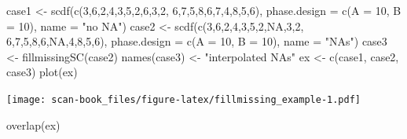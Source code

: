 \documentclass[
]{book}
\newenvironment{Shaded}{\begin{snugshade}}{\end{snugshade}}
\newcommand{\AttributeTok}[1]{\textcolor[rgb]{0.77,0.63,0.00}{#1}}
\newcommand{\ConstantTok}[1]{\textcolor[rgb]{0.00,0.00,0.00}{#1}}
\newcommand{\DecValTok}[1]{\textcolor[rgb]{0.00,0.00,0.81}{#1}}
\newcommand{\FunctionTok}[1]{\textcolor[rgb]{0.00,0.00,0.00}{#1}}
\newcommand{\NormalTok}[1]{#1}
\newcommand{\OtherTok}[1]{\textcolor[rgb]{0.56,0.35,0.01}{#1}}
\newcommand{\StringTok}[1]{\textcolor[rgb]{0.31,0.60,0.02}{#1}}
\begin{document}
\begin{Shaded}
\begin{Highlighting}[]
\NormalTok{case1 }\OtherTok{\textless{}{-}} \FunctionTok{scdf}\NormalTok{(}\FunctionTok{c}\NormalTok{(}\DecValTok{3}\NormalTok{,}\DecValTok{6}\NormalTok{,}\DecValTok{2}\NormalTok{,}\DecValTok{4}\NormalTok{,}\DecValTok{3}\NormalTok{,}\DecValTok{5}\NormalTok{,}\DecValTok{2}\NormalTok{,}\DecValTok{6}\NormalTok{,}\DecValTok{3}\NormalTok{,}\DecValTok{2}\NormalTok{, }\DecValTok{6}\NormalTok{,}\DecValTok{7}\NormalTok{,}\DecValTok{5}\NormalTok{,}\DecValTok{8}\NormalTok{,}\DecValTok{6}\NormalTok{,}\DecValTok{7}\NormalTok{,}\DecValTok{4}\NormalTok{,}\DecValTok{8}\NormalTok{,}\DecValTok{5}\NormalTok{,}\DecValTok{6}\NormalTok{), }
              \AttributeTok{phase.design =} \FunctionTok{c}\NormalTok{(}\AttributeTok{A =} \DecValTok{10}\NormalTok{, }\AttributeTok{B =} \DecValTok{10}\NormalTok{), }\AttributeTok{name =} \StringTok{"no NA"}\NormalTok{)}
\NormalTok{case2 }\OtherTok{\textless{}{-}} \FunctionTok{scdf}\NormalTok{(}\FunctionTok{c}\NormalTok{(}\DecValTok{3}\NormalTok{,}\DecValTok{6}\NormalTok{,}\DecValTok{2}\NormalTok{,}\DecValTok{4}\NormalTok{,}\DecValTok{3}\NormalTok{,}\DecValTok{5}\NormalTok{,}\DecValTok{2}\NormalTok{,}\ConstantTok{NA}\NormalTok{,}\DecValTok{3}\NormalTok{,}\DecValTok{2}\NormalTok{, }\DecValTok{6}\NormalTok{,}\DecValTok{7}\NormalTok{,}\DecValTok{5}\NormalTok{,}\DecValTok{8}\NormalTok{,}\DecValTok{6}\NormalTok{,}\ConstantTok{NA}\NormalTok{,}\DecValTok{4}\NormalTok{,}\DecValTok{8}\NormalTok{,}\DecValTok{5}\NormalTok{,}\DecValTok{6}\NormalTok{), }
              \AttributeTok{phase.design =} \FunctionTok{c}\NormalTok{(}\AttributeTok{A =} \DecValTok{10}\NormalTok{, }\AttributeTok{B =} \DecValTok{10}\NormalTok{), }\AttributeTok{name =} \StringTok{"NAs"}\NormalTok{)}
\NormalTok{case3 }\OtherTok{\textless{}{-}} \FunctionTok{fillmissingSC}\NormalTok{(case2)}
\FunctionTok{names}\NormalTok{(case3) }\OtherTok{\textless{}{-}} \StringTok{"interpolated NAs"}
\NormalTok{ex }\OtherTok{\textless{}{-}} \FunctionTok{c}\NormalTok{(case1, case2, case3)}
\FunctionTok{plot}\NormalTok{(ex)}
\end{Highlighting}
\end{Shaded}

\texttt{[image: scan-book\_files/figure-latex/fillmissing\_example-1.pdf]}

\begin{Shaded}
\begin{Highlighting}[]
\FunctionTok{overlap}\NormalTok{(ex)}
\end{Highlighting}
\end{Shaded}
\end{document}
